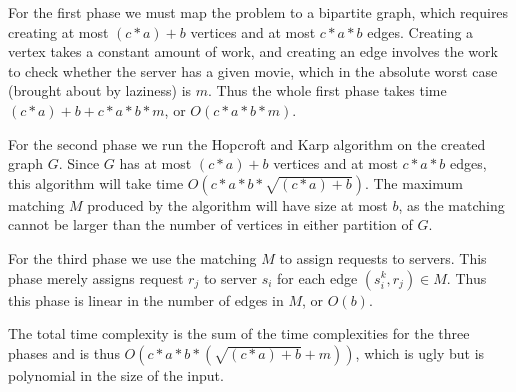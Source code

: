 \documentclass{article}
\begin{document}
\begin{enumerate}
\par For the first phase we must map the problem to a bipartite graph, which requires creating at most $(c * a) + b$ vertices and at most $c * a * b$ edges. Creating a vertex takes a constant amount of work, and creating an edge involves the work to check whether the server has a given movie, which in the absolute worst case (brought about by laziness) is $m$. Thus the whole first phase takes time $(c * a) + b + c * a * b * m$, or $O(c * a * b * m)$.

\par For the second phase we run the Hopcroft and Karp algorithm on the created graph $G$.  Since $G$ has at most $(c * a) + b$ vertices and at most $c * a * b$ edges, this algorithm will take time $O(c * a * b * \sqrt{(c * a) + b})$. The maximum matching $M$ produced by the algorithm will have size at most $b$, as the matching cannot be larger than the number of vertices in either partition of $G$.

\par For the third phase we use the matching $M$ to assign requests to servers. This phase merely assigns request $r_j$ to server $s_i$ for each edge $(s_i^k, r_j) \in M$. Thus this phase is linear in the number of edges in $M$, or $O(b)$.

\par The total time complexity is the sum of the time complexities for the three phases and is thus $O(c * a * b * ( \sqrt{(c * a) + b} + m ) )$, which is ugly but is polynomial in the size of the input.




\end{enumerate}
\end{document}
